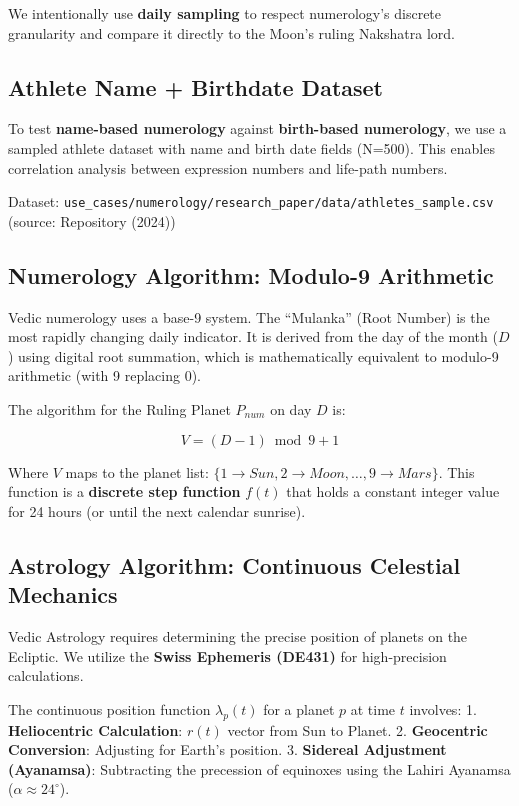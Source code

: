 \documentclass[
  american,
  11pt,
  oneside,
  openany]{article}
\begin{document}
We intentionally use \textbf{daily sampling} to respect numerology's
discrete granularity and compare it directly to the Moon's ruling
Nakshatra lord.

\subsection{Athlete Name + Birthdate
Dataset}\label{athlete-name-birthdate-dataset}

To test \textbf{name-based numerology} against \textbf{birth-based
numerology}, we use a sampled athlete dataset with name and birth date
fields (N=500). This enables correlation analysis between expression
numbers and life-path numbers.

Dataset:
\texttt{use\_cases/numerology/research\_paper/data/athletes\_sample.csv}
(source: Repository (2024))

\subsection{Numerology Algorithm: Modulo-9
Arithmetic}\label{numerology-algorithm-modulo-9-arithmetic}

Vedic numerology uses a base-9 system. The ``Mulanka'' (Root Number) is
the most rapidly changing daily indicator. It is derived from the day of
the month (\(D\)) using digital root summation, which is mathematically
equivalent to modulo-9 arithmetic (with 9 replacing 0).

The algorithm for the Ruling Planet \(P_{num}\) on day \(D\) is:

\[
V = (D - 1) \bmod 9 + 1
\]

Where \(V\) maps to the planet list:
\(\{1 \to Sun, 2 \to Moon, \dots, 9 \to Mars\}\). This function is a
\textbf{discrete step function} \(f(t)\) that holds a constant integer
value for 24 hours (or until the next calendar sunrise).

\subsection{Astrology Algorithm: Continuous Celestial
Mechanics}\label{astrology-algorithm-continuous-celestial-mechanics}

Vedic Astrology requires determining the precise position of planets on
the Ecliptic. We utilize the \textbf{Swiss Ephemeris (DE431)} for
high-precision calculations.

The continuous position function \(\lambda_p(t)\) for a planet \(p\) at
time \(t\) involves: 1. \textbf{Heliocentric Calculation}: \(r(t)\)
vector from Sun to Planet. 2. \textbf{Geocentric Conversion}: Adjusting
for Earth's position. 3. \textbf{Sidereal Adjustment (Ayanamsa)}:
Subtracting the precession of equinoxes using the Lahiri Ayanamsa
(\(\alpha \approx 24^\circ\)).
\end{document}
